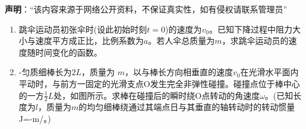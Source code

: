 
\textbf{声明}：“该内容来源于网络公开资料，不保证真实性，如有侵权请联系管理员”

\begin{enumerate}
\item 跳伞运动员初张伞时(设此初始时刻$t=0$)的速度为$v_0$。已知下降过程中阻力大小与速度平方成正比，比例系数为$a$。若人伞总质量为$m$，求跳伞运动员的速度随时间变化的函数。
\item -匀质细棒长为$ 2L$，质量为 $m$，以与棒长方向相垂直的速度$v_0$在光滑水平面内平动时，与前方一固定的光滑支点O发生完全非弹性碰撞。碰撞点位于棒中心的一方$\frac{1}{2}L$处，如图所示。求棒在碰撞后的瞬时绕O点转动的角速度$\omega$。(已知长度为$l$，质量为$m$的均匀细棒绕通过其端点日与其垂直的轴转动时的转动惯量J=-m/。)
\end{enumerate}